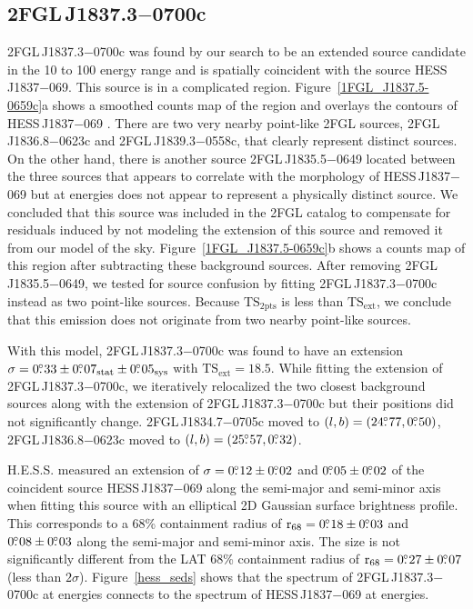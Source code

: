 \documentclass[12pt,preprint]{aastex}
\newcommand{\gev}{\text{GeV}\xspace}
\newcommand{\tev}{\text{TeV}\xspace}
\newcommand{\tsext}{{\ensuremath{\text{TS}_{\text{ext}}}}\xspace}
\newcommand{\tsinc}{\ensuremath{\text{TS}_{\text{2pts}}}\xspace}
\newcommand{\rsixeight}{{\ensuremath{\text{r}_{68}}}\xspace}
\newcommand{\sys}{\text{sys}\xspace}
\newcommand{\stat}{\text{stat}\xspace}
\begin{document}
\subsection{2FGL\,J1837.3$-$0700c}
\label{section_2FGL_J1837.3-0700c}



2FGL\,J1837.3$-$0700c was found by our search to be an extended source
candidate in the 10 \gev to 100 \gev energy range and is spatially
coincident with the \tev source HESS\,J1837$-$069.  This source is
in a complicated region.  Figure~\ref{1FGL_J1837.5-0659c}a shows a
smoothed counts map of the region and overlays the \tev contours of
HESS\,J1837$-$069 \citep{hess_plane_survey}.  There are two very nearby
point-like 2FGL sources, 2FGL\,J1836.8$-$0623c and 2FGL\,J1839.3$-$0558c,
that clearly represent distinct sources.  On the other hand, there is
another source 2FGL\,J1835.5$-$0649 located between the three sources that
appears to correlate with the \tev morphology of HESS\,J1837$-$069 but
at \gev energies
does not appear to represent a physically distinct source.  We concluded
that this source was included in the 2FGL catalog to compensate for residuals induced by
not modeling the extension of this source and removed it from our model
of the sky.  Figure~\ref{1FGL_J1837.5-0659c}b shows a
counts map of this region after subtracting these background sources.
After removing 2FGL\,J1835.5$-$0649,
we tested for
source confusion by fitting 
2FGL\,J1837.3$-$0700c
instead as two point-like sources.
Because \tsinc is less than \tsext, we conclude that this emission
does not originate from two nearby point-like sources.

With this model, 2FGL\,J1837.3$-$0700c was found to have an
extension $\sigma=0\fdg33\pm0\fdg07_\stat\pm0\fdg05_\sys$ with 
$\tsext=18.5$. 
While fitting the extension of 2FGL\,J1837.3$-$0700c,
we iteratively relocalized the two closest
background sources along with the extension of 2FGL\,J1837.3$-$0700c but
their positions did not significantly change.  2FGL\,J1834.7$-$0705c
moved to $(l,b)=(24\mbox{$.\!\!^\circ$}77,0\mbox{$.\!\!^\circ$}50)$, 2FGL\,J1836.8$-$0623c moved
to $(l,b)=(25\mbox{$.\!\!^\circ$}57,0\mbox{$.\!\!^\circ$}32)$. 

H.E.S.S. measured an extension of
$\sigma=0\mbox{$.\!\!^\circ$}12\pm0\mbox{$.\!\!^\circ$}02$ and $0\mbox{$.\!\!^\circ$}05\pm0\mbox{$.\!\!^\circ$}02$ 
of the coincident \tev source HESS\,J1837$-$069 
along the semi-major and semi-minor axis when fitting this source
with an elliptical 2D Gaussian surface brightness profile.  This corresponds
to a 68\% containment radius of $\rsixeight=0\fdg18\pm0\fdg03$ and
$0\mbox{$.\!\!^\circ$}08\pm0\mbox{$.\!\!^\circ$}03$ along the semi-major and semi-minor axis. The
size is not significantly different from the LAT 68\% containment
radius of $\rsixeight=0\fdg27\pm0\fdg07$ (less than $2\sigma$).
Figure~\ref{hess_seds} shows that the spectrum of 2FGL\,J1837.3$-$0700c
at \gev energies connects to the spectrum of HESS\,J1837$-$069 at \tev
energies.
\end{document}
